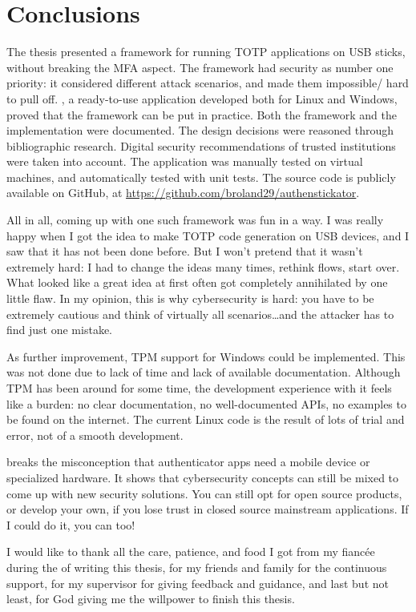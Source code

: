 \chapter{Conclusions}

The thesis presented a framework for running TOTP applications on USB sticks, without breaking the MFA aspect.
The framework had security as number one priority: it considered different attack scenarios, and made them impossible/ hard to pull off.
\app{}, a ready-to-use application developed both for Linux and Windows, proved that the framework can be put in practice.
Both the framework and the implementation were documented.
The design decisions were reasoned through bibliographic research.
Digital security recommendations of trusted institutions were taken into account.
The application was manually tested on virtual machines, and automatically tested with unit tests.
The source code is publicly available on GitHub, at \url{https://github.com/broland29/authenstickator}.

All in all, coming up with one such framework was fun in a way.
I was really happy when I got the idea to make TOTP code generation on USB devices, and I saw that it has not been done before.
But I won't pretend that it wasn't extremely hard: I had to change the ideas many times, rethink flows, start over.
What looked like a great idea at first often got completely annihilated by one little flaw.
In my opinion, this is why cybersecurity is hard: you have to be extremely cautious and think of virtually all scenarios\dots and the attacker has to find just one mistake.

As further improvement, TPM support for Windows could be implemented.
This was not done due to lack of time and lack of available documentation.
Although TPM has been around for some time, the development experience with it feels like a burden: no clear documentation, no well-documented APIs, no examples to be found on the internet.
The current Linux code is the result of lots of trial and error, not of a smooth development.

\app{} breaks the misconception that authenticator apps need a mobile device or specialized hardware.
It shows that cybersecurity concepts can still be mixed to come up with new security solutions.
You can still opt for open source products, or develop your own, if you lose trust in closed source mainstream applications.
If I could do it, you can too!

I would like to thank all the care, patience, and food I got from my fiancée during the of writing this thesis, for my friends and family for the continuous support, for my supervisor for giving feedback and guidance, and last but not least, for God giving me the willpower to finish this thesis.
